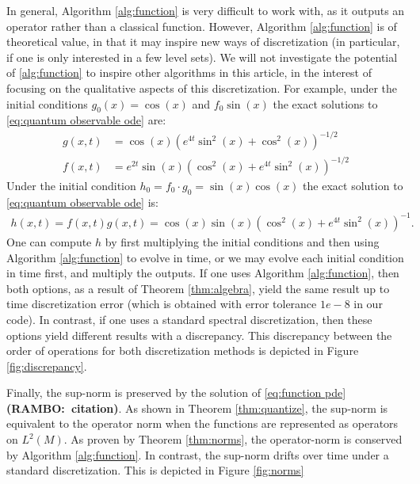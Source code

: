 \documentclass[final,leqno]{siamltex1213}
\newcommand{\ram}[1]{{\normalsize{\textbf{({\color{red}RAMBO:\ }#1)}}}}
\begin{document}
%
In general, Algorithm \ref{alg:function} is very difficult to work with, as it outputs an operator rather than a classical function.
However, Algorithm \ref{alg:function} is of theoretical value, in that it may inspire new ways of discretization (in particular, if one is only interested in a few level sets).
We will not investigate the potential of \ref{alg:function} to inspire other algorithms in this article, in the interest of focusing on the qualitative aspects of this discretization.
For example, under the initial conditions $g_{0}(x) = \cos(x)$ and $f_{0} \sin(x)$ the exact solutions to \eqref{eq:quantum observable ode} are:
\begin{align*}
	g(x,t) &=   \cos(x) \left( e^{4t} \sin^{2}(x) + \cos^{2}(x) \right)^{-1/2}\\
	f(x,t) &=   e^{2t} \sin(x) \left( \cos^{2}(x) + e^{4t} \sin^{2}(x) \right)^{-1/2}
\end{align*}
Under the initial condition $h_{0} = f_{0} \cdot g_{0}  = \sin(x) \cos(x)$ the exact solution to \eqref{eq:quantum observable ode} is:
\begin{align*}
	h(x,t) = f(x,t) g(x,t) = \cos(x) \sin(x) \left( \cos^{2}(x) + e^{4t} \sin^{2}(x) \right)^{-1}.
\end{align*}
One can compute $h$ by first multiplying the initial conditions and then using Algorithm \ref{alg:function} to evolve in time, or we may evolve each initial condition in time first, and multiply the outputs.
If one uses Algorithm \ref{alg:function}, then both options, as a result of Theorem \ref{thm:algebra}, yield the same result up to time discretization error (which is obtained with error tolerance $1e-8$ in our code).
In contrast, if one uses a standard spectral discretization, then these options yield different results with a discrepancy.
This discrepancy between the order of operations for both discretization methods is depicted in Figure \ref{fig:discrepancy}.

Finally, the sup-norm is preserved by the solution of \eqref{eq:function pde} \ram{citation}.
As shown in Theorem \ref{thm:quantize}, the sup-norm is equivalent to the operator norm when the functions are represented as operators on $L^{2}(M)$.
As proven by Theorem \ref{thm:norms}, the operator-norm is conserved by Algorithm \ref{alg:function}.
In contrast, the sup-norm drifts over time under a standard discretization.  
This is depicted in Figure \ref{fig:norms}
\end{document}
